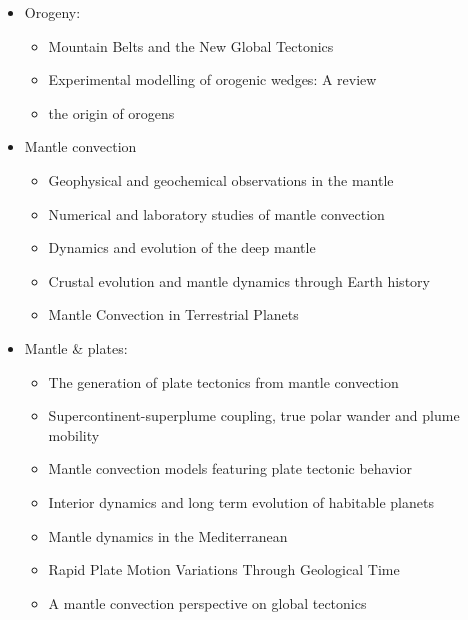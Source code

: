 \begin{itemize}
\item Orogeny:
   \begin{itemize}
   \item [\nineteenseventy] Mountain Belts and the New Global Tectonics  \cite{debi70}
   \item [\twothousandtwelve] Experimental modelling of orogenic wedges: A review \cite{grmd12} 
   \item [\twothousandthirteen] the origin of orogens \cite{jabe13}
   \end{itemize}

\item Mantle convection 

   \begin{itemize}
   \item [\nineteenninetytwo] Geophysical and geochemical observations in the mantle \cite{dari92}
   \item [\twothousandfive] Numerical and laboratory studies of mantle convection \cite{taxn05}
   \item [\twothousandtwelve] Dynamics and evolution of the deep mantle  \cite{tack12}
   \item [\twothousandeighteen] Crustal evolution and mantle dynamics through Earth history \cite{kore18}
   \item [\twothousandtwenty] Mantle Convection in Terrestrial Planets \cite{mube20}
   \end{itemize}

\item Mantle \& plates:
   \begin{itemize}
   \item [\twothousandthree] The generation of plate tectonics from mantle convection \cite{berc03}
   \item [\twothousandnine] Supercontinent-superplume coupling, true polar wander and plume mobility \cite{lizh09}
   \item [\twothousandeleven] Mantle convection models featuring plate tectonic behavior \cite{lowm11}
   \item [\twothousandtwelve] Interior dynamics and long term evolution of habitable planets \cite{taab12}
   \item [\twothousandfourteen] Mantle dynamics in the Mediterranean \cite{faba14}
   \item [\twothousandfifteen] Rapid Plate Motion Variations Through Geological Time \cite{iabu15}
   \item [\twothousandseventeen] A mantle convection perspective on global tectonics \cite{cogu17}
   \end{itemize}


\end{itemize}

